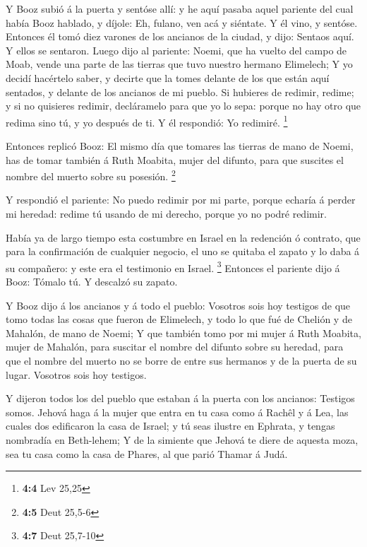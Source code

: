  Y Booz subió á la puerta y sentóse allí: y he aquí pasaba
aquel pariente del cual había Booz hablado, y díjole: Eh, fulano, ven
acá y siéntate. Y él vino, y sentóse.  Entonces él tomó
diez varones de los ancianos de la ciudad, y dijo: Sentaos aquí. Y ellos
se sentaron.  Luego dijo al pariente: Noemi, que ha vuelto
del campo de Moab, vende una parte de las tierras que tuvo nuestro
hermano Elimelech;  Y yo decidí hacértelo saber, y decirte
que la tomes delante de los que están aquí sentados, y delante de los
ancianos de mi pueblo. Si hubieres de redimir, redime; y si no quisieres
redimir, decláramelo para que yo lo sepa: porque no hay otro que redima
sino tú, y yo después de ti. Y él respondió: Yo redimiré. \footnote{\textbf{4:4}
  Lev 25,25}

 Entonces replicó Booz: El mismo día que tomares las
tierras de mano de Noemi, has de tomar también á Ruth Moabita, mujer del
difunto, para que suscites el nombre del muerto sobre su posesión.
\footnote{\textbf{4:5} Deut 25,5-6}

 Y respondió el pariente: No puedo redimir por mi parte,
porque echaría á perder mi heredad: redime tú usando de mi derecho,
porque yo no podré redimir.

 Había ya de largo tiempo esta costumbre en Israel en la
redención ó contrato, que para la confirmación de cualquier negocio, el
uno se quitaba el zapato y lo daba á su compañero: y este era el
testimonio en Israel. \footnote{\textbf{4:7} Deut 25,7-10}
 Entonces el pariente dijo á Booz: Tómalo tú. Y descalzó
su zapato.

 Y Booz dijo á los ancianos y á todo el pueblo: Vosotros
sois hoy testigos de que tomo todas las cosas que fueron de Elimelech, y
todo lo que fué de Chelión y de Mahalón, de mano de Noemi;
 Y que también tomo por mi mujer á Ruth Moabita, mujer de
Mahalón, para suscitar el nombre del difunto sobre su heredad, para que
el nombre del muerto no se borre de entre sus hermanos y de la puerta de
su lugar. Vosotros sois hoy testigos.

 Y dijeron todos los del pueblo que estaban á la puerta
con los ancianos: Testigos somos. Jehová haga á la mujer que entra en tu
casa como á Rachêl y á Lea, las cuales dos edificaron la casa de Israel;
y tú seas ilustre en Ephrata, y tengas nombradía en Beth-lehem;
 Y de la simiente que Jehová te diere de aquesta moza,
sea tu casa como la casa de Phares, al que parió Thamar á Judá.

